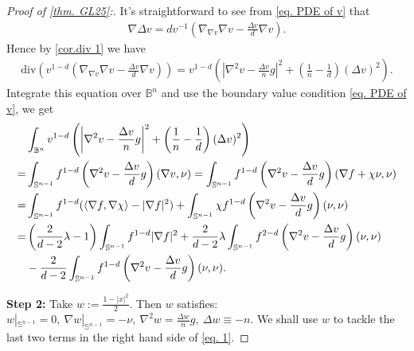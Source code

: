 \documentclass[12pt]{amsart}
\numberwithin{equation}{section}
\numberwithin{lemma}{section}
\numberwithin{proposition}{section}
\numberwithin{corollary}{section}
\numberwithin{remark}{section}
\begin{document}
\begin{proof}[Proof of \cref{thm. GL25}:]
    It's straightforward to see from \cref{eq. PDE of v} that
    \begin{align}\label{eq. nabla Delta v}
        \nabla \Delta v
        =dv^{-1}
        \left(\nabla_{\nabla v}\nabla v-\frac{\Delta v}{d}\nabla v\right).
    \end{align}
    Hence by \cref{cor.div 1} we have
    \begin{align}\label{eq. div 1_1-d}
        \mathrm{div}\left(
        v^{1-d}\left(\nabla_{\nabla v}\nabla v-\frac{\Delta v}{d}\nabla v\right)
        \right)
        =v^{1-d}\left(
        \left|\nabla^2 v-\frac{\Delta v}{n}g\right|^2
        +\left(\frac{1}{n}-\frac{1}{d}\right)(\Delta v)^2
        \right).
    \end{align}
    Integrate this equation over $\mathbb{B}^n$ and use the boundary value condition \cref{eq. PDE of v}, we get
    \begin{align}\label{eq. 1}
        &\int_{\mathbb{B}^n}v^{1-d}\left(
        \left|\nabla^2 v-\frac{\Delta v}{n}g\right|^2
        +\left(\frac{1}{n}-\frac{1}{d}\right)(\Delta v)^2
        \right)\notag\\
        =&\int_{\mathbb{S}^{n-1}}f^{1-d}
        \left(\nabla^2 v-\frac{\Delta v}{d}g\right)(\nabla v,\nu)\notag
        =\int_{\mathbb{S}^{n-1}}f^{1-d}
        \left(\nabla^2 v-\frac{\Delta v}{d}g\right)(\nabla f+\chi\nu,\nu)\\
        =&\int_{\mathbb{S}^{n-1}}f^{1-d}(\langle \nabla f,\nabla \chi\rangle-|\nabla f|^2)
        +\int_{\mathbb{S}^{n-1}}\chi f^{1-d}
        \left(\nabla^2 v-\frac{\Delta v}{d}g\right)(\nu,\nu)\notag\\
        =&\left(\frac{2}{d-2}\lambda-1\right)
        \int_{\mathbb{S}^{n-1}}f^{1-d}|\nabla f|^2
        +\frac{2}{d-2}\lambda
        \int_{\mathbb{S}^{n-1}}f^{2-d}
        \left(\nabla^2 v-\frac{\Delta v}{d}g\right)(\nu,\nu)\notag\\
        &-\frac{2}{d-2}
        \int_{\mathbb{S}^{n-1}}f^{1-d}
        \left(\nabla^2 v-\frac{\Delta v}{d}g\right)(\nu,\nu).
    \end{align}

    \textbf{Step 2:} Take $w:=\frac{1-|x|^2}{2}$. Then $w$ satisfies: $w|_{\mathbb{S}^{n-1}}=0,\ \nabla w|_{\mathbb{S}^{n-1}}=-\nu,\  \nabla^2 w=\frac{\Delta w}{n}g,\ \Delta w\equiv-n$. We shall use $w$ to tackle the last two terms in the right hand side of \cref{eq. 1}.


\end{proof}
\end{document}
